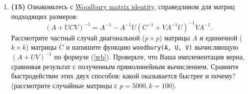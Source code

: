 \documentclass[prb,papersize=a4paper,notitlepage]{revtex4-1}%
\begin{document}
\begin{enumerate}
\item \textbf{(15)} Ознакомьтесь с \href{https://en.wikipedia.org/wiki/Woodbury_matrix_identity}{Woodbury matrix identity}, справедливом для матриц подходящих размеров:
\begin{equation}
\label{wb}
\left(A+UCV\right)^{-1}=A^{-1}-A^{-1}U\left(C^{-1}+VA^{-1}U\right)^{-1}VA^{-1}.
\end{equation}
Рассмотрите частный случай диагональной ($p\times p$) матрицы $A$ и единичной ($k\times k$) матрицы $C$ и напишите функцию \lstinline{woodbury(A, U, V)} вычисляющую $\left(A+UV\right)^{-1}$ по формуле (\ref{wb}). Проверьте, что Ваша имплементация верна, сравнивая результат с полученным прямолинейным вычислением.
Сравните быстродействие этих двух способов: какой оказывается быстрее и почему? (рассмотрите случайные матрицы с $p = 5000, k = 100$).




\end{enumerate}
\end{document}
